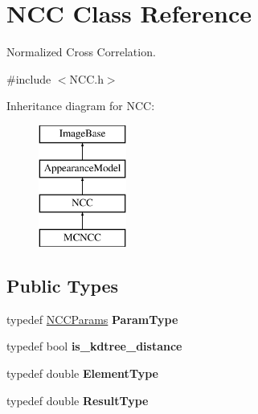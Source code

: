 \hypertarget{classNCC}{\section{N\-C\-C Class Reference}
\label{classNCC}
}


Normalized Cross Correlation.  




{\ttfamily \#include $<$N\-C\-C.\-h$>$}

Inheritance diagram for N\-C\-C\-:\begin{figure}[H]
\begin{center}
\leavevmode
\includegraphics[height=4.000000cm]{classNCC}
\end{center}
\end{figure}
\subsection*{Public Types}
\begin{DoxyCompactItemize}
\item 
\hypertarget{classNCC_a3b142d5d0868896c253f68fb83a1539c}{typedef \hyperlink{structNCCParams}{N\-C\-C\-Params} {\bfseries Param\-Type}}\label{classNCC_a3b142d5d0868896c253f68fb83a1539c}

\item 
\hypertarget{classNCC_a35b6188cad5170612d7cd4e4bc1d1fae}{typedef bool {\bfseries is\-\_\-kdtree\-\_\-distance}}\label{classNCC_a35b6188cad5170612d7cd4e4bc1d1fae}

\item 
\hypertarget{classNCC_a7ee3384e87caad93c22f0625432f2dd0}{typedef double {\bfseries Element\-Type}}\label{classNCC_a7ee3384e87caad93c22f0625432f2dd0}

\item 
\hypertarget{classNCC_aa965a34010f0a92af66e1ae5599e6163}{typedef double {\bfseries Result\-Type}}\label{classNCC_aa965a34010f0a92af66e1ae5599e6163}

\end{DoxyCompactItemize}
